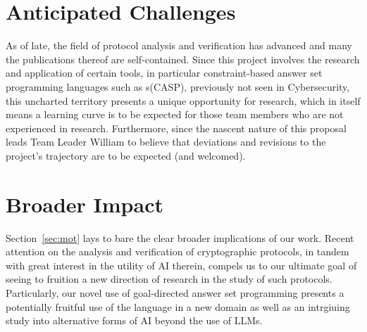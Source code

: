 \documentclass[11pt]{article}
\begin{document}
\section{Anticipated Challenges}
As of late, the field of protocol analysis and verification has advanced and many the publications thereof are self-contained. Since this project involves the research and application of certain tools, in particular constraint-based answer set programming languages such as s(CASP), previously not seen in Cybersecurity, this uncharted territory presents a unique opportunity for research, which in itself means a learning curve is to be expected for those team members who are not \text{ } experienced in research. Furthermore, since the nascent nature of this proposal leads Team Leader William to believe that deviations and revisions to the project's trajectory are to be expected (and welcomed). 

\section{Broader Impact}
Section~\ref{sec:mot} lays to bare the clear broader implications of our work. Recent attention on the analysis and verification of cryptographic protocols, in tandem with great interest in the utility of AI therein, compels us to our ultimate goal of seeing to fruition a new direction of research in the study of such protocols. Particularly, our novel use of goal-directed answer set programming presents a potentially fruitful use of the language in a new domain as well as an intrgiuing study into alternative forms of AI beyond the use of LLMs. 
\end{document}
